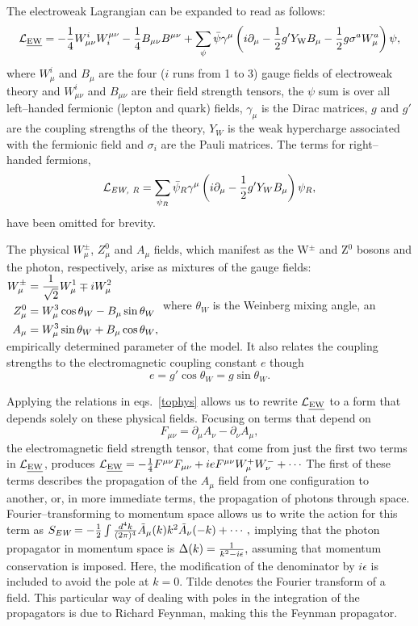 The electroweak Lagrangian can be expanded to read as follows:
\[\mathcal{L}_\text{\emph{EW}}=-\frac{1}{4}W^i_{\mu\nu}W_i^{\mu\nu}-\frac{1}{4}B_{\mu\nu}B^{\mu\nu}+\sum_\psi\bar\psi\gamma^\mu \left(i\partial_\mu-{\frac{1}{2}}g^\prime Y_\mathrm{W}B_\mu-{\frac{1}{2}}g\sigma^a W^a_\mu\right)\psi,\]
where $W^i_{\mu}$ and $B_{\mu}$ are the four ($i$ runs from 1 to 3) gauge fields of electroweak theory and $W^i_{\mu\nu}$ and $B_{\mu\nu}$ are their field strength tensors, the $\psi$ sum is over all left--handed fermionic (lepton and quark) fields, $\gamma_{\mu}$ is the Dirac matrices, $g$ and $g'$ are the coupling strengths of the theory, $Y_W$ is the weak hypercharge associated with the fermionic field and $\sigma_i$ are the Pauli matrices. The terms for right--handed fermions,
\[\mathcal L_\textit{EW, R}=\sum_{\psi_R}\bar\psi_R\gamma^\mu\left(i\partial_\mu-\frac{1}{2} g'Y_W B_\mu\right)\psi_R,\]
have been omitted for brevity.

The physical $W^\pm_\mu$, $Z^0_\mu$ and $A_\mu$ fields, which manifest as the W$^\pm$ and Z$^0$ bosons and the photon, respectively, arise as mixtures of the gauge fields:
\(\begin{aligned}
W_\mu^\pm&=\frac{1}{\sqrt{2}} W^1_\mu\mp iW^2_\mu\\
Z^0_\mu&=W^3_\mu\cos \theta_W-B_\mu\sin \theta_W\\
A_\mu&=W^3_\mu\sin\theta_W+B_\mu\cos\theta_W,
\end{aligned}\label{tophys}\)
where $\theta_W$ is the Weinberg mixing angle, an empirically determined parameter of the model. It also relates the coupling strengths to the electromagnetic coupling constant $e$ though
\[e=g'\cos\theta_W=g\sin\theta_W.\]

Applying the relations in eqs.~\eqref{tophys} allows us to rewrite $\mathcal{L}_{\text{\emph{EW}}}$ to a form that depends solely on these physical fields. Focusing on terms that depend on
\[F_{\mu\nu}=\partial_\mu A_\nu - \partial_\nu A_\mu,\]
the electromagnetic field strength tensor, that come from just the first two terms in $\mathcal{L}_{\text{\emph{EW}}}$, produces
\(\mathcal{L}_{\text{\emph{EW}}}=-\ono4 F^{\mu\nu}F_{\mu\nu}+ie F^{\mu\nu}W^{+}_\mu W^{-}_\nu+\cdots\label{ewfmn}\)
The first of these terms describes the propagation of the $A_\mu$ field from one configuration to another, or, in more immediate terms, the propagation of photons through space. Fourier--transforming to momentum space allows us to write the action for this term as
\(S_{\textit{EW}}=-\frac{1}{2}\int\frac{d^4k}{(2\pi)^4}\tilde A_\mu(k)k^2\tilde A_\nu(-k)+\cdots,\)
implying that the photon propagator in momentum space is
\(\Delta(k)=\frac{1}{k^2-i\epsilon},\label{phopropeq}\)
assuming that momentum conservation is imposed. Here, the modification of the denominator by $i\epsilon$ is included to avoid the pole at $k=0$. Tilde denotes the Fourier transform of a field. This particular way of dealing with poles in the integration of the propagators is due to Richard Feynman, making this the Feynman propagator.


